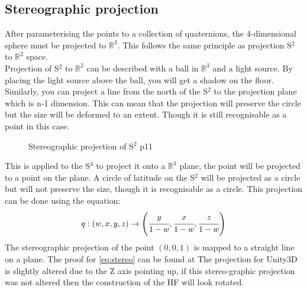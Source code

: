 \documentclass[12pt]{article} %
\begin{document}
\begin{flushleft}
\subsection{Stereographic projection} %
After parameterising the points to a collection of quaternions, the 4-dimensional sphere must be projected to $\mathbb{R}^{3}$. This follows the same principle as projection S$^{2}$ to $\mathbb{R}^{2}$ space.\\
Projection of S$^{2}$ to $\mathbb{R}^{2}$ can be described with a ball in $\mathbb{R}^{3}$ and a light source. By placing the light source above the ball, you will get a shadow on the floor. Similarly, you can project a line from the north of the S$^{2}$ to the projection plane which is n-1 dimension. This can mean that the projection will preserve the circle but the size will be deformed to an extent. Though it is still recognisable as a point in this case.

\begin{figure}[H] %
\caption{Stereographic projection of S$^{2}$ \cite{Lyons:2003dg} p11}
\label{fig:speciation}
\end{figure}

This is applied to the S$^{3}$ to project it onto a $\mathbb{R}^{3}$ plane, the point will be projected to a point on the plane. A circle of latitude on the S$^{2}$ will be projected as a circle but will not preserve the size, though it is recognisable as a circle. This projection can be done using the equation: \\
\begin{equation}\label{eq:stereo}\large q:(w, x, y, z) \rightarrow \left(\cfrac{y}{1 - w}, \cfrac{x}{1 - w}, \cfrac{z}{1 - w}\right)\end{equation}
The stereographic projection of the point $(0, 0, 1)$ is mapped to a straight line on a plane. The proof for \eqref{eq:stereo} can be found at \cite{Ahlfors:s}
The projection for Unity3D is slightly altered due to the Z axis pointing up, if this stereo-graphic projection was not altered then the construction of the HF will look rotated. 
\newpage

\end{flushleft}
\end{document}

